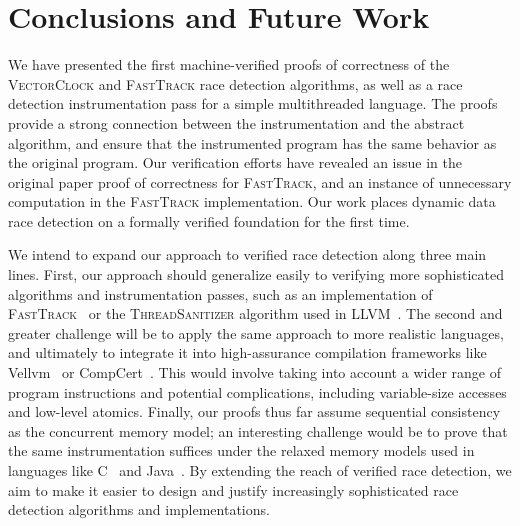 \documentclass[preprint, 10pt]{sigplanconf}
\newcommand{\VCalg}{\textsc{VectorClock}\xspace}
\newcommand{\FT}{\textsc{FastTrack}\xspace}
\begin{document}
\section{Conclusions and Future Work}
\label{conclusion}

We have presented the first machine-verified proofs of correctness of the \VCalg and \FT race detection algorithms, as well as a race detection instrumentation pass for a simple multithreaded language. The proofs provide a strong connection between the instrumentation and the abstract algorithm, and ensure that the instrumented program has the same behavior as the original program. Our verification efforts have revealed an issue in the original paper proof of correctness for \FT, and an instance of unnecessary computation in the \FT implementation. Our work places dynamic data race detection on a formally verified foundation for the first time.

We intend to expand our approach to verified race detection along three main lines. First, our approach should generalize easily to verifying more sophisticated algorithms and instrumentation passes, such as an implementation of \FT~\cite{fasttrack} or the \textsc{ThreadSanitizer} algorithm used in LLVM~\cite{serebryany_threadsanitizer:_2009}. The second and greater challenge will be to apply the same approach to more realistic languages, and ultimately to integrate it into high-assurance compilation frameworks like Vellvm~\cite{vellvm} or CompCert~\cite{compcert}. This would involve taking into account a wider range of program instructions and potential complications, including variable-size accesses and low-level atomics. Finally, our proofs thus far assume sequential consistency as the concurrent memory model; an interesting challenge would be to prove that the same instrumentation suffices under the relaxed memory models used in languages like C~\cite{boehm_foundations_2008} and Java~\cite{manson_java_2005}. By extending the reach of verified race detection, we aim to make it easier to design and justify increasingly sophisticated race detection algorithms and implementations.




\end{document}
